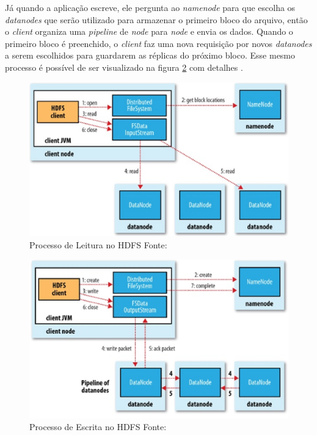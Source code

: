                 Já quando a aplicação escreve, ele pergunta ao \textit{namenode} para que escolha os \textit{datanodes}
                que serão utilizado para armazenar o primeiro bloco do arquivo, então o \textit{client} organiza uma
                \textit{pipeline} de \textit{node} para \textit{node} e envia os dados. Quando o primeiro bloco é
                preenchido, o \textit{client} faz uma nova requisição por novos \textit{datanodes} a serem escolhidos
                para guardarem as réplicas do próximo bloco. Esse mesmo processo é possível de ser visualizado na figura
                \ref{figura4} com detalhes \cite{shvachko2010}.

                \begin{figure}[ht!]
                    \centering
                    \includegraphics[keepaspectratio=true,scale=0.75]
                        {figuras/figura3.eps}
                    \caption[Processo de Leitura no HDFS]{Processo de Leitura no HDFS
                    \protect\linebreak Fonte: }
                    \label{figura3}
                \end{figure}

                \begin{figure}[ht!]
                    \centering
                    \includegraphics[keepaspectratio=true,scale=0.75]
                        {figuras/figura4.eps}
                    \caption[Processo de Escrita no HDFS]{Processo de Escrita no HDFS
                    \protect\linebreak Fonte: }
                    \label{figura4}
                \end{figure}

